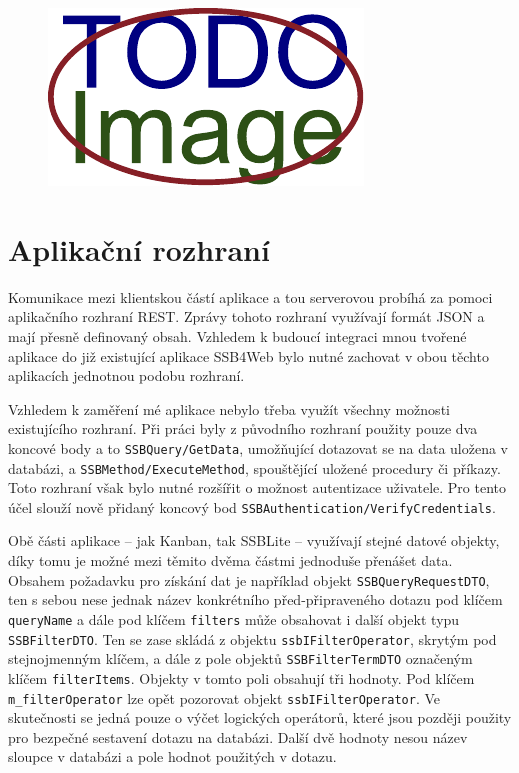 \begin{figure}[H]
	\centering
	\includegraphics[width=\textwidth]{obrazky-figures/placeholder.pdf}
\end{figure}


\section{Aplikační rozhraní}\label{sec:api}
Komunikace mezi klientskou částí aplikace a tou serverovou probíhá za pomoci aplikačního rozhraní REST. Zprávy tohoto rozhraní využívají formát JSON a mají přesně definovaný obsah.
Vzhledem k budoucí integraci mnou tvořené aplikace do již existující aplikace SSB4Web bylo nutné zachovat v obou těchto aplikacích jednotnou podobu rozhraní.

Vzhledem k zaměření mé aplikace nebylo třeba využít všechny možnosti existujícího rozhraní. Při práci byly z původního rozhraní použity pouze dva koncové body a to \texttt{SSBQuery/GetData}, umožňující dotazovat se na data uložena v databázi, a \sloppy\texttt{SSBMethod/ExecuteMethod}, spouštějící uložené procedury či příkazy. Toto rozhraní však bylo nutné rozšířit o možnost autentizace uživatele. Pro tento účel slouží nově přidaný koncový bod \sloppy\texttt{SSBAuthentication/VerifyCredentials}.

Obě části aplikace -- jak Kanban, tak SSBLite -- využívají stejné datové objekty, díky tomu je možné mezi těmito dvěma částmi jednoduše přenášet data. Obsahem požadavku pro získání dat je například objekt \texttt{SSBQueryRequestDTO}, ten s sebou nese jednak název konkrétního před-připraveného dotazu pod klíčem \texttt{queryName} a dále pod klíčem \texttt{filters} může obsahovat i další objekt typu \texttt{SSBFilterDTO}. Ten se zase skládá z objektu \texttt{ssbIFilterOperator}, skrytým pod stejnojmenným klíčem, a dále z pole objektů \texttt{SSBFilterTermDTO} označeným klíčem \texttt{filterItems}. Objekty v tomto poli obsahují tři hodnoty. Pod klíčem \texttt{m\_filterOperator} lze opět pozorovat objekt \texttt{ssbIFilterOperator}. Ve skutečnosti se jedná pouze o výčet logických operátorů, které jsou později použity pro bezpečné sestavení dotazu na databázi. Další dvě hodnoty nesou název sloupce v databázi a pole hodnot použitých v dotazu.

